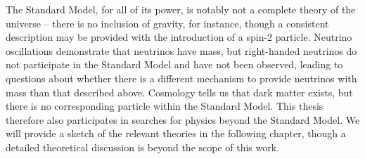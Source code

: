 The Standard Model, for all of its power,
is notably not a complete theory of the universe -- there is no inclusion of gravity, for instance, though a 
consistent description may be provided with the introduction of a spin-2 particle. Neutrino oscillations 
demonstrate that neutrinos have mass, but right-handed neutrinos do not participate in the Standard Model 
and have not been observed, leading to questions about whether there is a different mechanism to provide neutrinos with mass than that described above. Cosmology 
tells us that dark matter exists, but there is no corresponding particle within the Standard Model. 
This thesis therefore also participates in searches for physics beyond the Standard Model. We will provide a sketch
of the relevant theories in the following chapter, though a detailed theoretical discussion is beyond the scope of 
this work.
